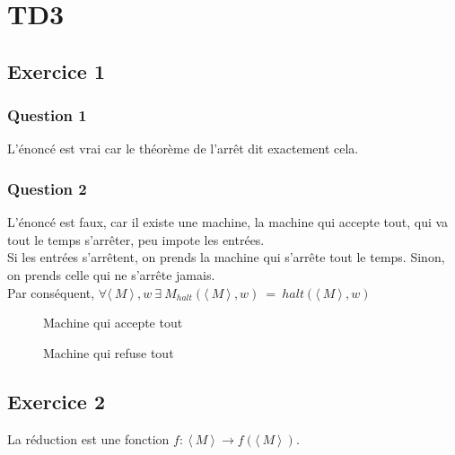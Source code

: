 \section{TD3}

\subsection{Exercice 1}

\subsubsection{Question 1}

L'énoncé est vrai car le théorème de l'arrêt dit exactement cela.

\subsubsection{Question 2}

L'énoncé est faux, car il existe une machine, la machine qui accepte tout, qui va tout le temps s'arrêter, peu impote les entrées.\\
Si les entrées s'arrêtent, on prends la machine qui s'arrête tout le temps. Sinon, on prends celle qui ne s'arrête jamais.\\
Par conséquent, $\forall \langle\ M\ \rangle \!\ ,w~\exists~M_{halt}(\langle\ M\ \rangle \!\ , w)~=~halt(\langle\ M\ \rangle \!\ , w)$

\begin{figure}[ht]
  \centering
  \caption{Machine qui accepte tout}
\end{figure}

\begin{figure}[ht]
  \centering
  \caption{Machine qui refuse tout}
\end{figure}

\subsection{Exercice 2}

La réduction est une fonction $f:~\langle\ M\ \rangle \!\ \rightarrow f(\langle\ M\ \rangle \!\ )$.

